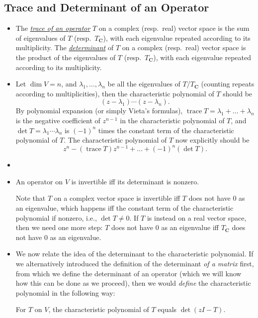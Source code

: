 \documentclass{article}
\newcommand{\df}[1]{\ul{\textit{#1}}}
\newcommand{\C}{\mathbf{C}}
\renewcommand{\d}{\dim}
\newcommand{\tr}{\operatorname{trace}}
\begin{document}
\subsection{Trace and Determinant of an Operator}
\begin{itemize}
    \item The \df{trace of an operator} $T$ on a complex (resp.\ real) vector space is the sum of eigenvalues of $T$ (resp.\ $T_\C$), with each eigenvalue repeated according to its multiplicity. The \df{determinant} of $T$ on a complex (resp.\ real) vector space is the product of the eigenvalues of $T$ (resp.\ $T_\C$), with each eigenvalue repeated according to its multiplicity.
    \item Let $\d V = n$, and $\lambda_1,\dots,\lambda_n$ be all the eigenvalues of $T$/$T_\C$ (counting repeats according to multiplicities), then the characteristic polynomial of $T$ should be \[(z-\lambda_1)\cdots(z-\lambda_n).\] By polynomial expansion (or simply Vieta's formulas), $\tr T = \lambda_1 +\dots+\lambda_n$ is the negative coefficient of $z^{n-1}$ in the characteristic polynomial of $T$, and $\det T = \lambda_1 \cdots \lambda_n$ is $(-1)^n$ times the constant term of the characteristic polynomial of $T$. The characteristic polynomial of $T$ now explicitly should be \[z^n - (\tr T) z^{n-1} + \dots + (-1)^n (\det T).\]
    \item 
    \item An operator on $V$ is invertible iff its determinant is nonzero.
    
    Note that $T$ on a complex vector space is invertible iff $T$ does not have 0 as an eigenvalue, which happens iff the constant term of the characteristic polynomial if nonzero, i.e., $\det T \neq 0$. If $T$ is instead on a real vector space, then we need one more step: $T$ does not have 0 as an eigenvalue iff $T_\C$ does not have 0 as an eigenvalue.
    \item We now relate the idea of the determinant to the characteristic polynomial. If we alternatively introduced the definition of the determinant \emph{of a matrix} first, from which we define the determinant of an operator (which we will know how this can be done as we proceed), then we would \emph{define} the characteristic polynomial in the following way: 
    \begin{center}
        For $T$ on $V$, the characteristic polynomial of $T$ equals $\det(zI - T)$.
    \end{center}
    

\end{itemize}
\end{document}
